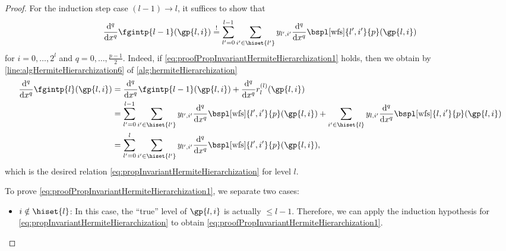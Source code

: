 \begin{proof}
  For the induction step case $(l-1) \to l$,
  it suffices to show that
  \begin{equation}
    \label{eq:proofPropInvariantHermiteHierarchization1}
    \frac{\diff^q}{\dx^q} \fgintp{l-1}(\gp{l,i})
    \overset{!}{=} \sum_{l'=0}^{l-1} \sum_{i' \in \hiset{l'}}
    \linout{l',i'} \frac{\diff^q}{\dx^q} \bspl[\wfs]{l',i'}{p}(\gp{l,i})
  \end{equation}
  for $i = 0, \dotsc, 2^l$ and $q = 0, \dotsc, \frac{p-1}{2}$.
  Indeed, if \eqref{eq:proofPropInvariantHermiteHierarchization1} holds,
  then we obtain by \cref{line:algHermiteHierarchization6}
  of \cref{alg:hermiteHierarchization}
  \begin{subequations}
    \begin{align}
      \frac{\diff^q}{\dx^q} \fgintp{l}(\gp{l,i})
      &= \frac{\diff^q}{\dx^q} \fgintp{l-1}(\gp{l,i}) +
      \frac{\diff^q}{\dx^q} r^{(l)}_l(\gp{l,i})\\
      &= \sum_{l'=0}^{l-1} \sum_{i' \in \hiset{l'}}
      \linout{l',i'} \frac{\diff^q}{\dx^q} \bspl[\wfs]{l',i'}{p}(\gp{l,i}) +
      \sum_{i' \in \hiset{l}}
      \linout{l,i'} \frac{\diff^q}{\dx^q} \bspl[\wfs]{l,i'}{p}(\gp{l,i})\\
      &= \sum_{l'=0}^l \sum_{i' \in \hiset{l'}}
      \linout{l',i'} \frac{\diff^q}{\dx^q} \bspl[\wfs]{l',i'}{p}(\gp{l,i}),
    \end{align}
  \end{subequations}
  which is the desired relation
  \eqref{eq:propInvariantHermiteHierarchization}
  for level $l$.
  
  To prove \eqref{eq:proofPropInvariantHermiteHierarchization1},
  we separate two cases:
  \begin{itemize}
    \item
    $i \notin \hiset{l}$:
    In this case, the ``true'' level of $\gp{l,i}$ is actually $\le l - 1$.
    Therefore, we can apply the induction hypothesis
    for \cref{eq:propInvariantHermiteHierarchization} to
    obtain \eqref{eq:proofPropInvariantHermiteHierarchization1}.
    

\end{itemize}
\end{proof}
